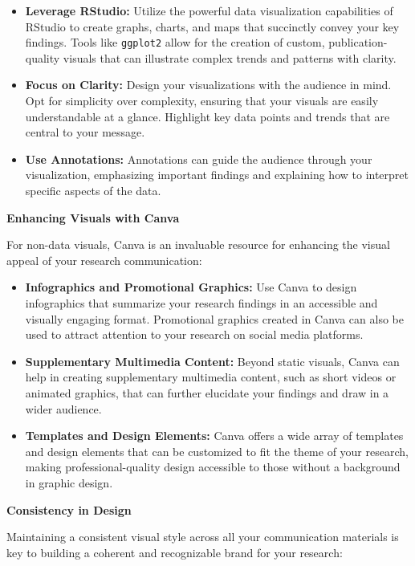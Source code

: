 \documentclass[
]{book}
\begin{document}
\begin{itemize}
\item
  \textbf{Leverage RStudio:} Utilize the powerful data visualization capabilities of RStudio to create graphs, charts, and maps that succinctly convey your key findings. Tools like \texttt{ggplot2} allow for the creation of custom, publication-quality visuals that can illustrate complex trends and patterns with clarity.
\item
  \textbf{Focus on Clarity:} Design your visualizations with the audience in mind. Opt for simplicity over complexity, ensuring that your visuals are easily understandable at a glance. Highlight key data points and trends that are central to your message.
\item
  \textbf{Use Annotations:} Annotations can guide the audience through your visualization, emphasizing important findings and explaining how to interpret specific aspects of the data.
\end{itemize}

\textbf{Enhancing Visuals with Canva}

For non-data visuals, Canva is an invaluable resource for enhancing the visual appeal of your research communication:

\begin{itemize}
\item
  \textbf{Infographics and Promotional Graphics:} Use Canva to design infographics that summarize your research findings in an accessible and visually engaging format. Promotional graphics created in Canva can also be used to attract attention to your research on social media platforms.
\item
  \textbf{Supplementary Multimedia Content:} Beyond static visuals, Canva can help in creating supplementary multimedia content, such as short videos or animated graphics, that can further elucidate your findings and draw in a wider audience.
\item
  \textbf{Templates and Design Elements:} Canva offers a wide array of templates and design elements that can be customized to fit the theme of your research, making professional-quality design accessible to those without a background in graphic design.
\end{itemize}

\textbf{Consistency in Design}

Maintaining a consistent visual style across all your communication materials is key to building a coherent and recognizable brand for your research:
\end{document}
